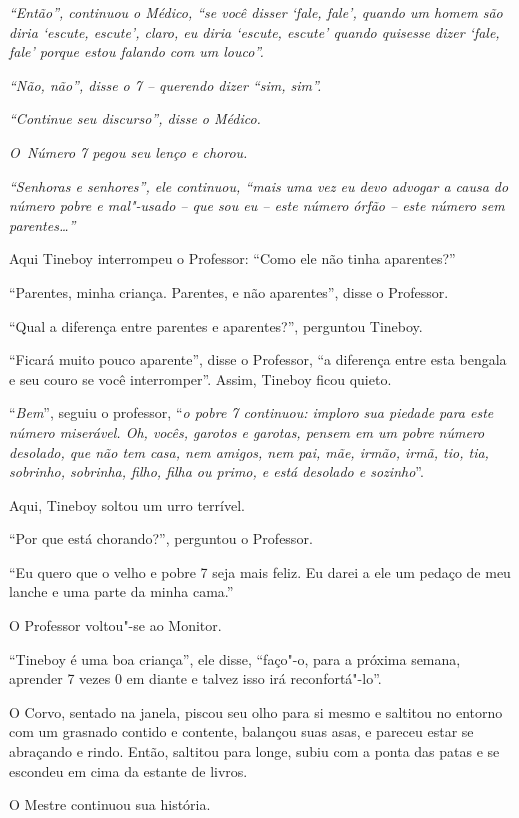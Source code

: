 \emph{``Então'', continuou o Médico, ``se você disser `fale, fale',
quando um homem são diria `escute, escute', claro, eu diria `escute,
escute' quando quisesse dizer `fale, fale' porque estou falando com um
louco''.}

\emph{``Não, não'', disse o 7 -- querendo dizer ``sim, sim''.}

\emph{``Continue seu discurso'', disse o Médico.}

\emph{O~Número 7 pegou seu lenço e chorou.}

\emph{``Senhoras e senhores'', ele continuou, ``mais uma vez eu devo
advogar a causa do número pobre e mal"-usado -- que sou eu -- este número
órfão -- este número sem parentes…''}

Aqui Tineboy interrompeu o Professor: ``Como ele não tinha aparentes?''

``Parentes, minha criança. Parentes, e não aparentes'', disse o
Professor.

``Qual a diferença entre parentes e aparentes?'', perguntou Tineboy.

``Ficará muito pouco aparente'', disse o Professor, ``a diferença entre
esta bengala e seu couro se você interromper''. Assim, Tineboy ficou
quieto.

``\emph{Bem}'', seguiu o professor, ``\emph{o pobre 7 continuou: imploro
sua piedade para este número miserável. Oh, vocês, garotos e garotas,
pensem em um pobre número desolado, que não tem casa, nem amigos, nem
pai, mãe, irmão, irmã, tio, tia, sobrinho, sobrinha, filho, filha ou
primo, e está desolado e sozinho}''.

Aqui, Tineboy soltou um urro terrível.

``Por que está chorando?'', perguntou o Professor.

``Eu quero que o velho e pobre 7 seja mais feliz. Eu darei a ele um
pedaço de meu lanche e uma parte da minha cama.''

O Professor voltou"-se ao Monitor.

``Tineboy é uma boa criança'', ele disse, ``faço"-o, para a próxima
semana, aprender 7 vezes 0 em diante e talvez isso irá reconfortá"-lo''.

O Corvo, sentado na janela, piscou seu olho para si mesmo e saltitou no
entorno com um grasnado contido e contente, balançou suas asas, e
pareceu estar se abraçando e rindo. Então, saltitou para longe, subiu
com a ponta das patas e se escondeu em cima da estante de livros.

O Mestre continuou sua história.

